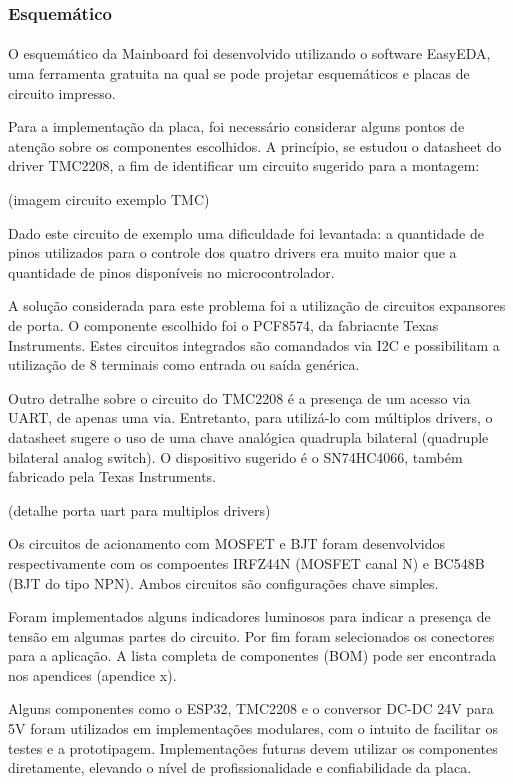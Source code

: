 \documentclass[12pt, english]{article}
\begin{document}
\subsubsection{Esquemático}

\paragraph{}
O esquemático da Mainboard foi desenvolvido utilizando o software EasyEDA, uma ferramenta gratuita na qual se pode projetar esquemáticos e placas de circuito impresso.

Para a implementação da placa, foi necessário considerar alguns pontos de atenção sobre os componentes escolhidos. A princípio, se estudou o datasheet do driver TMC2208, a fim de identificar um circuito sugerido para a montagem:

(imagem circuito exemplo TMC)

Dado este circuito de exemplo uma dificuldade foi levantada: a quantidade de pinos utilizados para o controle dos quatro drivers era muito maior que a quantidade de pinos disponíveis no microcontrolador.

A solução considerada para este problema foi a utilização de circuitos expansores de porta. O componente escolhido foi o PCF8574, da fabriacnte Texas Instruments. Estes circuitos integrados são comandados via I2C e possibilitam a utilização de 8 terminais como entrada ou saída genérica.

Outro detralhe sobre o circuito do TMC2208 é a presença de um acesso via UART, de apenas uma via. Entretanto, para utilizá-lo com múltiplos drivers, o datasheet sugere o uso de uma chave analógica quadrupla bilateral (quadruple bilateral analog switch). O dispositivo sugerido é o SN74HC4066, também fabricado pela Texas Instruments.

(detalhe porta uart para multiplos drivers)

Os circuitos de acionamento com MOSFET e BJT foram desenvolvidos respectivamente com os compoentes IRFZ44N (MOSFET canal N) e BC548B (BJT do tipo NPN). Ambos circuitos são configurações chave simples.

Foram implementados alguns indicadores luminosos para indicar a presença de tensão em algumas partes do circuito. Por fim foram selecionados os conectores para a aplicação. A lista completa de componentes (BOM) pode ser encontrada nos apendices (apendice x).

Alguns componentes como o ESP32, TMC2208 e o conversor DC-DC 24V para 5V foram utilizados em implementações modulares, com o intuito de facilitar os testes e a prototipagem. Implementações futuras devem utilizar os componentes diretamente, elevando o nível de profissionalidade e confiabilidade da placa.
\end{document}
